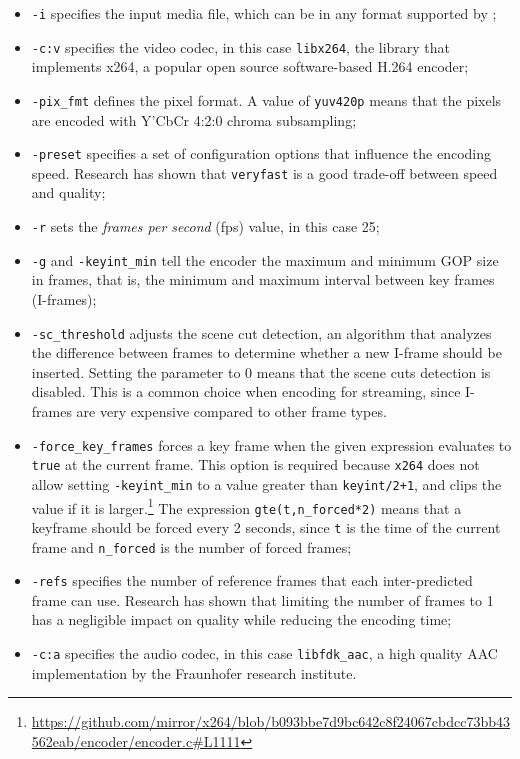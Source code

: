 \begin{itemize}
    \item \texttt{-i} specifies the input media file, which can be in any format supported by \ffmpeg{};
    \item \texttt{-c:v} specifies the video codec, in this case \texttt{libx264}, the library that implements x264, a popular open source software-based H.264 encoder;
    \item \texttt{-pix\_fmt} defines the pixel format. A value of \texttt{yuv420p} means that the pixels are encoded with Y'CbCr 4:2:0 chroma subsampling;
    \item \texttt{-preset} specifies a set of configuration options that influence the encoding speed. Research has shown that \texttt{veryfast} is a good trade-off between speed and quality;\cite{ozer}
    \item \texttt{-r} sets the \textit{frames per second} (fps) value, in this case 25;
    \item \texttt{-g} and \texttt{-keyint\_min} tell the encoder the maximum and minimum GOP size in frames, that is, the minimum and maximum interval between key frames (I-frames);
    \item \texttt{-sc\_threshold} adjusts the scene cut detection, an algorithm that analyzes the difference between frames to determine whether a new I-frame should be inserted. Setting the parameter to 0 means that the scene cuts detection is disabled. This is a common choice when encoding for streaming, since I-frames are very expensive compared to other frame types.\cite{ozer}
    \item \texttt{-force\_key\_frames} forces a key frame when the given expression evaluates to \texttt{true} at the current frame. This option is required because \texttt{x264} does not allow setting \texttt{-keyint\_min} to a value greater than \texttt{keyint/2+1}, and clips the value if it is larger.\footnote{\url{https://github.com/mirror/x264/blob/b093bbe7d9bc642c8f24067cbdcc73bb43562eab/encoder/encoder.c\#L1111}} The expression \texttt{gte(t,n\_forced*2)} means that a keyframe should be forced every 2 seconds, since \texttt{t} is the time of the current frame and \texttt{n\_forced} is the number of forced frames;
    \item \texttt{-refs} specifies the number of reference frames that each inter-predicted frame can use. Research has shown that limiting the number of frames to 1 has a negligible impact on quality while reducing the encoding time;\cite{ozer}
    \item \texttt{-c:a} specifies the audio codec, in this case \texttt{libfdk\_aac}, a high quality AAC implementation by the Fraunhofer research institute.

\end{itemize}
